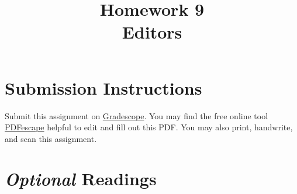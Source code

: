 \documentclass{article}
\begin{document}
\fancyhead[L]{}
\fancyhead[R]{}

\fancyfoot[C]{\color{gray} \thepage~/~\pageref*{LastPage}}
\pagestyle{fancyplain}


\title{\textbf{Homework 9\\Editors}}
\author{\textbf{\color{violet}{Solutions}}}
\date{}
\maketitle


\section*{Submission Instructions}
Submit this assignment on \href{https://gradescope.com/courses/3499}{Gradescope}.
You may find the free online tool \href{https://www.pdfescape.com}{PDFescape}
helpful to edit and fill out this PDF.
You may also print, handwrite, and scan this assignment.


\section*{\emph{Optional} Readings}
\end{document}

